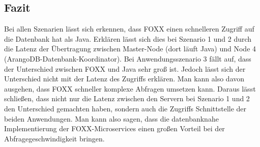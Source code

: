 
\subsection{Fazit}
Bei allen Szenarien lässt sich erkennen, dass FOXX einen schnelleren Zugriff auf die Datenbank hat als Java. Erklären lässt sich dies bei Szenario 1 und 2 durch die Latenz der Übertragung zwischen Master-Node (dort läuft Java) und Node 4 (ArangoDB-Datenbank-Koordinator). \newline
Bei Anwendungsszenario 3 fällt auf, dass der Unterschied zwischen FOXX und Java sehr groß ist. Jedoch lässt sich der Unterschied nicht mit der Latenz des Zugriffs erklären. Man kann also davon ausgehen, dass FOXX schneller komplexe Abfragen umsetzen kann. \newline
Daraus lässt schließen, dass nicht nur die Latenz zwischen den Servern bei Szenario 1 und 2 den Unterschied gemachten haben, sondern auch die Zugriffs Schnittstelle der beiden Anwendungen. Man kann also sagen, dass die datenbanknahe Implementierung der FOXX-Microservices einen großen Vorteil bei der Abfragegeschwindigkeit bringen.